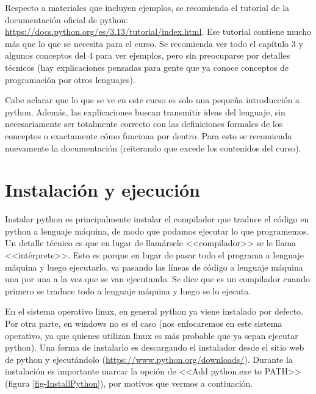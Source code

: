 \documentclass[a4paper, 12pt]{report}
\theoremstyle{definition}
\begin{document}
Respecto a materiales que incluyen ejemplos, se recomienda el tutorial de la documentación oficial de python: \href{https://docs.python.org/es/3.13/tutorial/index.html}{https://docs.python.org/es/3.13/tutorial/index.html}. Ese tutorial contiene mucho más que lo que se necesita para el curso. Se recomienda ver todo el capítulo 3 y algunos conceptos del 4 para ver ejemplos, pero sin preocuparse por detalles técnicos (hay explicaciones pensadas para gente que ya conoce conceptos de programación por otros lenguajes).

Cabe aclarar que lo que se ve en este curso es solo una pequeña introducción a python. Además, las explicaciones buscan transmitir ideas del lenguaje, sin necesariamente ser totalmente correcto con las definiciones formales de los conceptos o exactamente cómo funciona por dentro. Para esto se recomienda nuevamente la documentación (reiterando que excede los contenidos del curso).

\section{Instalación y ejecución}\label{sec-instalyEjec}

Instalar python es principalmente instalar el compilador que traduce el código en python a lenguaje máquina, de modo que podamos ejecutar lo que programemos. Un detalle técnico es que en lugar de llamársele <<compilador>> se le llama <<intérprete>>. Esto es porque en lugar de pasar todo el programa a lenguaje máquina y luego ejecutarlo, va pasando las líneas de código a lenguaje máquina una por una a la vez que se van ejecutando. Se dice que es un compilador cuando primero se traduce todo a lenguaje máquina y luego se lo ejecuta.

En el sistema operativo linux, en general python ya viene instalado por defecto. Por otra parte, en windows no es el caso (nos enfocaremos en este sistema operativo, ya que quienes utilizan linux es más probable que ya sepan ejecutar python). Una forma de instalarlo es descargando el instalador desde el sitio web de python y ejecutándolo (\href{https://www.python.org/downloads/}{https://www.python.org/downloads/}). Durante la instalación es importante marcar la opción de <<Add python.exe to PATH>> (figura \ref{fig-InstallPython}), por motivos que vermos a contiuación.
\end{document}
